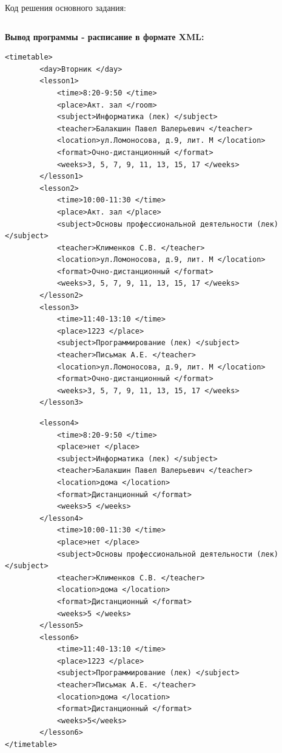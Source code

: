 \documentclass[12pt]{article}
\begin{document}
\newpage
Код решения основного задания:\\
\inputminted{python}{task1.py}
\newpage

\textbf{Вывод программы - расписание в формате XML:}
\begin{multicols}{2}
\begin{tiny}
\begin{verbatim}
<timetable>
        <day>Вторник </day>
        <lesson1>
            <time>8:20-9:50 </time>
            <place>Акт. зал </room>
            <subject>Информатика (лек) </subject>
            <teacher>Балакшин Павел Валерьевич </teacher>
            <location>ул.Ломоносова, д.9, лит. М </location>
            <format>Очно-дистанционный </format>
            <weeks>3, 5, 7, 9, 11, 13, 15, 17 </weeks>
        </lesson1>
        <lesson2>
            <time>10:00-11:30 </time>
            <place>Акт. зал </place>
            <subject>Основы профессиональной деятельности (лек) </subject>
            <teacher>Клименков С.В. </teacher>
            <location>ул.Ломоносова, д.9, лит. М </location>
            <format>Очно-дистанционный </format>
            <weeks>3, 5, 7, 9, 11, 13, 15, 17 </weeks>
        </lesson2>
        <lesson3>
            <time>11:40-13:10 </time>
            <place>1223 </place>
            <subject>Программирование (лек) </subject>
            <teacher>Письмак А.Е. </teacher>
            <location>ул.Ломоносова, д.9, лит. М </location>
            <format>Очно-дистанционный </format>
            <weeks>3, 5, 7, 9, 11, 13, 15, 17 </weeks>
        </lesson3>
 \end{verbatim}
\end{tiny}       
\columnbreak
\begin{tiny}
\begin{verbatim}        
        <lesson4>
            <time>8:20-9:50 </time>
            <place>нет </place>
            <subject>Информатика (лек) </subject>
            <teacher>Балакшин Павел Валерьевич </teacher>
            <location>дома </location>
            <format>Дистанционный </format>
            <weeks>5 </weeks>
        </lesson4>
            <time>10:00-11:30 </time>
            <place>нет </place>
            <subject>Основы профессиональной деятельности (лек) </subject>
            <teacher>Клименков С.В. </teacher>
            <location>дома </location>
            <format>Дистанционный </format>
            <weeks>5 </weeks>
        </lesson5>
        <lesson6>
            <time>11:40-13:10 </time>
            <place>1223 </place>
            <subject>Программирование (лек) </subject>
            <teacher>Письмак А.Е. </teacher>
            <location>дома </location>
            <format>Дистанционный </format>
            <weeks>5</weeks>
        </lesson6>
</timetable>
\end{verbatim}
\end{tiny}
\end{multicols}
\end{document}
